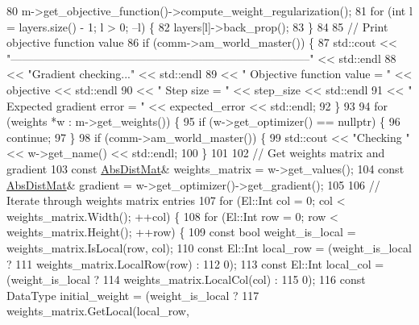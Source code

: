 \begin{DoxyCode}
80   m->get\_objective\_function()->compute\_weight\_regularization();
81   \textcolor{keywordflow}{for} (\textcolor{keywordtype}{int} l = layers.size() - 1; l > 0; --l) \{
82     layers[l]->back\_prop();
83   \}
84 
85   \textcolor{comment}{// Print objective function value}
86   \textcolor{keywordflow}{if} (comm->am\_world\_master()) \{
87     std::cout << \textcolor{stringliteral}{"--------------------------------------------------------------------------------"} << 
      std::endl
88               << \textcolor{stringliteral}{"Gradient checking..."} << std::endl
89               << \textcolor{stringliteral}{"  Objective function value = "} << objective << std::endl
90               << \textcolor{stringliteral}{"  Step size                = "} << step\_size << std::endl
91               << \textcolor{stringliteral}{"  Expected gradient error  = "} << expected\_error << std::endl;
92   \}
93 
94   \textcolor{keywordflow}{for} (weights *w : m->get\_weights()) \{
95     \textcolor{keywordflow}{if} (w->get\_optimizer() == \textcolor{keyword}{nullptr}) \{
96       \textcolor{keywordflow}{continue};
97     \}
98     \textcolor{keywordflow}{if} (comm->am\_world\_master()) \{
99       std::cout << \textcolor{stringliteral}{"Checking "} << w->get\_name() << std::endl;
100     \}
101 
102     \textcolor{comment}{// Get weights matrix and gradient}
103     \textcolor{keyword}{const} \hyperlink{base_8hpp_a9a697a504ae84010e7439ffec862b470}{AbsDistMat}& weights\_matrix = w->get\_values();
104     \textcolor{keyword}{const} \hyperlink{base_8hpp_a9a697a504ae84010e7439ffec862b470}{AbsDistMat}& gradient = w->get\_optimizer()->get\_gradient();
105 
106     \textcolor{comment}{// Iterate through weights matrix entries}
107     \textcolor{keywordflow}{for} (El::Int col = 0; col < weights\_matrix.Width(); ++col) \{
108       \textcolor{keywordflow}{for} (El::Int row = 0; row < weights\_matrix.Height(); ++row) \{
109         \textcolor{keyword}{const} \textcolor{keywordtype}{bool} weight\_is\_local = weights\_matrix.IsLocal(row, col);
110         \textcolor{keyword}{const} El::Int local\_row = (weight\_is\_local ?
111                                    weights\_matrix.LocalRow(row) :
112                                    0);
113         \textcolor{keyword}{const} El::Int local\_col = (weight\_is\_local ?
114                                    weights\_matrix.LocalCol(col) :
115                                    0);
116         \textcolor{keyword}{const} DataType initial\_weight = (weight\_is\_local ?
117                                          weights\_matrix.GetLocal(local\_row,

\end{DoxyCode}

